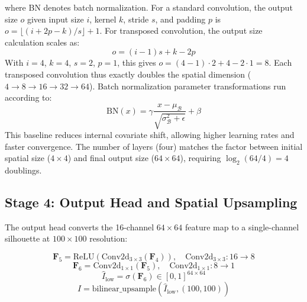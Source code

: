 \documentclass[12pt,a4paper,oneside]{report}
\begin{document}
where BN denotes batch normalization. For a standard convolution, the output size $o$ given input size $i$, kernel $k$, stride $s$, and padding $p$ is $o = \lfloor (i + 2p - k)/s \rfloor + 1$. For transposed convolution, the output size calculation scales as:
\begin{equation}
o = (i - 1)s + k - 2p
\end{equation}
With $i=4$, $k=4$, $s=2$, $p=1$, this gives $o = (4 - 1)\cdot 2 + 4 - 2\cdot 1 = 8$. Each transposed convolution thus exactly doubles the spatial dimension ($4 \rightarrow 8 \rightarrow 16 \rightarrow 32 \rightarrow 64$). Batch normalization parameter transformations run according to:
\begin{equation}
\text{BN}(x) = \gamma \frac{x - \mu_{\mathcal{B}}}{\sqrt{\sigma_{\mathcal{B}}^2 + \epsilon}} + \beta
\end{equation}
This baseline reduces internal covariate shift, allowing higher learning rates and faster convergence. The number of layers (four) matches the factor between initial spatial size ($4 \times 4$) and final output size ($64 \times 64$), requiring $\log_2(64/4) = 4$ doublings.

\subsection{Stage 4: Output Head and Spatial Upsampling}
\label{subsec:stage_4_output_head_and_spatial_upsampling}

The output head converts the 16-channel $64 \times 64$ feature map to a single-channel silhouette at $100 \times 100$ resolution:

\begin{equation}
\mathbf{F}_5 = \text{ReLU}(\text{Conv2d}_{3\times3}(\mathbf{F}_4)), \quad \text{Conv2d}_{3\times3}: 16 \rightarrow 8
\end{equation}
\begin{equation}
\mathbf{F}_6 = \text{Conv2d}_{1\times1}(\mathbf{F}_5), \quad \text{Conv2d}_{1\times1}: 8 \rightarrow 1
\end{equation}
\begin{equation}
\hat{I}_{\text{low}} = \sigma(\mathbf{F}_6) \in [0, 1]^{64 \times 64}
\end{equation}
\begin{equation}
\hat{I} = \text{bilinear\_upsample}(\hat{I}_{\text{low}}, (100, 100))
\end{equation}
\end{document}
